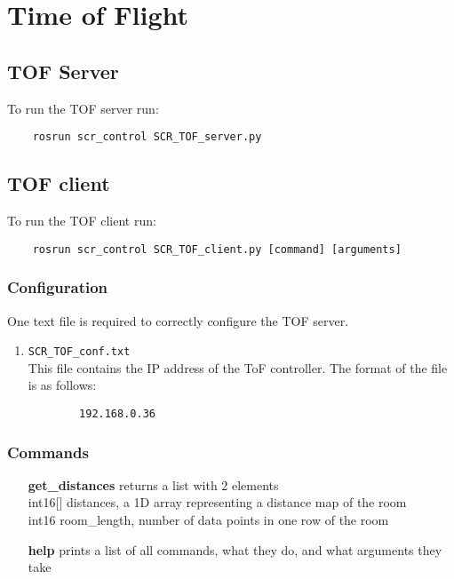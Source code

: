 \documentclass[twoside]{article}
\begin{document}
	\section{Time of Flight}

	
	
	\subsection{TOF Server}
	To run the TOF server run:
	\begin{verbatim}
	rosrun scr_control SCR_TOF_server.py
	\end{verbatim}
	
	\subsection{TOF client}
	To run the TOF client run:
	\begin{verbatim}
	rosrun scr_control SCR_TOF_client.py [command] [arguments]
	\end{verbatim}
	
	\subsubsection{Configuration}
	One text file is required to correctly configure the TOF server.
	
	\begin{enumerate}
		\item \verb|SCR_TOF_conf.txt|\\
		This file contains the IP address of the ToF controller. The format of the file is as follows:
		
		\begin{verbatim}
		192.168.0.36
		\end{verbatim}
		
	\end{enumerate}
	
	\subsubsection{Commands}
	
	\begin{enumerate}

		\item[\bf get\_distances]
		returns a list with 2 elements \\
		int16[] distances, a 1D array representing a distance map of the room \\
		int16 room\_length, number of data points in one row of the room
		
		\item[\bf help] prints a list of all commands, what they do, and what arguments they take
	\end{enumerate}
	
\end{document}
